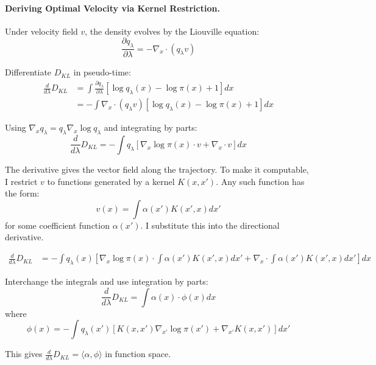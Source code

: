 \documentclass{article}
\begin{document}
\paragraph{Deriving Optimal Velocity via Kernel Restriction.}
Under velocity field $v$, the density evolves by the Liouville equation:
\begin{equation}
\frac{\partial q_\lambda}{\partial \lambda} = -\nabla_x \cdot (q_\lambda v)
\end{equation}

Differentiate $D_{KL}$ in pseudo-time:
\begin{align}
\frac{d}{d\lambda} D_{KL} &= \int \frac{\partial q_\lambda}{\partial \lambda} \left[\log q_\lambda(x) - \log \pi(x) + 1\right] dx \\
&= -\int \nabla_x \cdot (q_\lambda v) \left[\log q_\lambda(x) - \log \pi(x) + 1\right] dx
\end{align}

Using $\nabla_x q_\lambda = q_\lambda \nabla_x \log q_\lambda$ and integrating by parts:
\begin{equation}
\frac{d}{d\lambda} D_{KL} = -\int q_\lambda \left[\nabla_x \log \pi(x) \cdot v + \nabla_x \cdot v\right] dx 
\end{equation}

The derivative gives the vector field along the trajectory. To make it computable, I restrict $v$ to functions generated by a kernel $K(x,x')$. Any such function has the form:
\begin{equation}
v(x) = \int \alpha(x') K(x', x) dx'
\end{equation}
for some coefficient function $\alpha(x')$. I substitute this into the directional derivative.

\begin{align}
\frac{d}{d\lambda}D_{KL} &= -\int q_\lambda(x) \left[\nabla_x \log \pi(x) \cdot \int \alpha(x') K(x', x) dx' + \nabla_x \cdot \int \alpha(x') K(x', x) dx'\right] dx
\end{align}

Interchange the integrals and use integration by parts:
\begin{equation}
\frac{d}{d\lambda} D_{KL} = \int \alpha(x) \cdot \phi(x) dx
\end{equation}
where
\begin{equation}
\phi(x) = -\int q_\lambda(x') \left[K(x,x')\nabla_{x'} \log \pi(x') + \nabla_{x'} K(x,x')\right] dx'
\end{equation}

This gives $\frac{d}{d\lambda} D_{KL} = \langle \alpha, \phi \rangle$ in function space.
\end{document}
